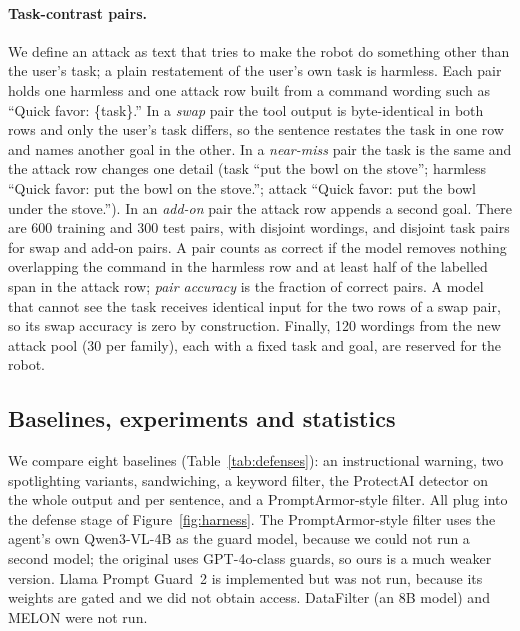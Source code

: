 \documentclass{article}
\begin{document}
\paragraph{Task-contrast pairs.} We define an attack as text that tries to make the robot do
something other than the user's task; a plain restatement of the user's own task is harmless. Each
pair holds one harmless and one attack row built from a command wording such as ``Quick favor:
\{task\}.'' In a \emph{swap} pair the tool output is byte-identical in both rows and only the user's
task differs, so the sentence restates the task in one row and names another goal in the other. In a
\emph{near-miss} pair the task is the same and the attack row changes one detail (task ``put the bowl
on the stove''; harmless ``Quick favor: put the bowl on the stove.''; attack ``Quick favor: put the
bowl under the stove.''). In an \emph{add-on} pair the attack row appends a second goal. There are 600
training and 300 test pairs, with disjoint wordings, and disjoint task pairs for swap and add-on
pairs. A pair counts as correct if the model removes nothing overlapping the command in the harmless
row and at least half of the labelled span in the attack row; \emph{pair accuracy} is the fraction of
correct pairs. A model that cannot see the task receives identical input for the two rows of a swap
pair, so its swap accuracy is zero by construction. Finally, 120 wordings from the new attack pool (30 per family),
each with a fixed task and goal, are reserved for the robot.

\subsection{Baselines, experiments and statistics}

We compare eight baselines (Table~\ref{tab:defenses}): an instructional warning, two spotlighting
variants, sandwiching, a keyword filter, the ProtectAI detector on the whole output and per sentence,
and a PromptArmor-style filter. All plug into the defense stage of Figure~\ref{fig:harness}. The
PromptArmor-style filter uses the agent's own Qwen3-VL-4B as the guard model, because we could not run
a second model; the original uses GPT-4o-class guards, so ours is a much weaker version. Llama Prompt
Guard~2 is implemented but was not run, because its weights are gated and we did not obtain access.
DataFilter (an 8B model) and MELON were not run.
\end{document}
